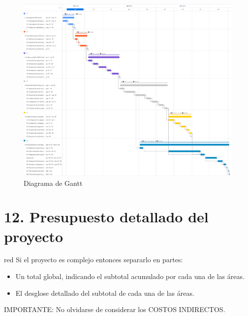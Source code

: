 \documentclass[
11pt, %
]{charter}
\begin{document}
\begin{landscape}
\begin{figure}[htpb]
\centering 
\includegraphics[height=.85\textheight]{./Figuras/Gantt-2.png}
\caption{Diagrama de Gantt}
\label{fig:diagGantt}
\end{figure}

\end{landscape}




\section{12. Presupuesto detallado del proyecto}
\label{sec:presupuesto}

\begin{consigna}{red}
Si el proyecto es complejo entonces separarlo en partes:
\begin{itemize}
	\item Un total global, indicando el subtotal acumulado por cada una de las áreas.
	\item El desglose detallado del subtotal de cada una de las áreas.
\end{itemize}

IMPORTANTE: No olvidarse de considerar los COSTOS INDIRECTOS.

\end{consigna}
\end{document}
